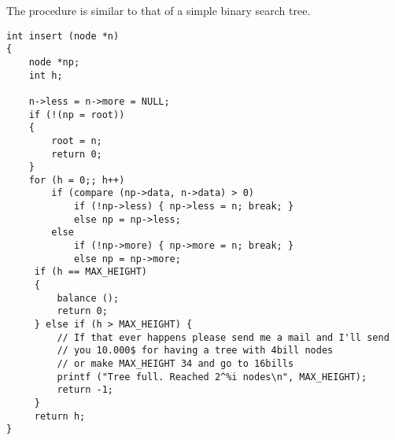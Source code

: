 \documentclass[twocolumn]{article}
\begin{document}
The procedure is similar to that of a simple binary search tree.

\begin{verbatim}
int insert (node *n)
{
    node *np;
    int h;

    n->less = n->more = NULL;
    if (!(np = root))
    {
        root = n;
        return 0;
    }
    for (h = 0;; h++)
        if (compare (np->data, n->data) > 0)
            if (!np->less) { np->less = n; break; }
            else np = np->less;
        else
            if (!np->more) { np->more = n; break; }
            else np = np->more;
     if (h == MAX_HEIGHT)
     {
         balance ();
         return 0;
     } else if (h > MAX_HEIGHT) {
         // If that ever happens please send me a mail and I'll send
         // you 10.000$ for having a tree with 4bill nodes
         // or make MAX_HEIGHT 34 and go to 16bills
         printf ("Tree full. Reached 2^%i nodes\n", MAX_HEIGHT);
         return -1;
     }
     return h;
}
\end{verbatim}
\end{document}
